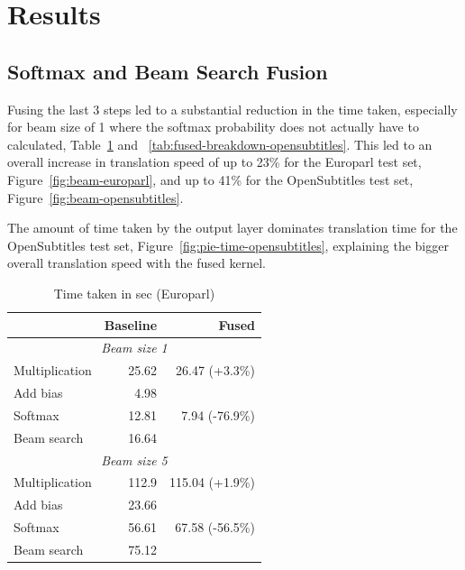 \documentclass[11pt,a4paper]{article}
\begin{document}
\section{Results}
\label{sec:Results}

\subsection{Softmax and Beam Search Fusion}

Fusing the last 3 steps led to a substantial reduction in the time taken, especially for beam size of 1 where the softmax probability does not actually have to calculated, Table~\ref{tab:fused-breakdown-europarl} and ~\ref{tab:fused-breakdown-opensubtitles}. This led to an overall increase in translation speed of up to 23\% for the Europarl test set, Figure~\ref{fig:beam-europarl}, and up to 41\% for the OpenSubtitles test set, Figure~\ref{fig:beam-opensubtitles}. 

The amount of time taken by the output layer dominates translation time for the OpenSubtitles test set, Figure~\ref{fig:pie-time-opensubtitles}, explaining the bigger overall translation speed with the fused kernel.

\begin{table}
\begin{center}
\small
\begin{tabular}{|l|r|r|} \hline
		& Baseline	& Fused \\ \hline
\multicolumn{3}{|c|}{\emph{Beam size 1}}	\\ \hline	
Multiplication 	& 25.62 	& 26.47 (+3.3\%) \\ \hline
Add bias 	& 4.98		&  \\ 
Softmax 	& 12.81		& 7.94 (-76.9\%)\\
Beam search	& 16.64		&  \\ \hline
\multicolumn{3}{|c|}{\emph{Beam size 5}}	\\ \hline	
Multiplication 	& 112.9 	& 115.04 (+1.9\%) \\ \hline
Add bias 	& 23.66		&  \\ 
Softmax 	& 56.61		& 67.58 (-56.5\%)\\
Beam search	& 75.12		&  \\ \hline
\end{tabular}
\end{center}
\caption{Time taken in sec (Europarl)}
\label{tab:fused-breakdown-europarl}
\end{table}
\end{document}
